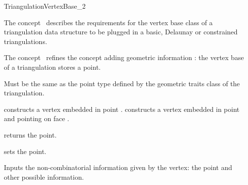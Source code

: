 

\begin{ccRefConcept}{TriangulationVertexBase_2}


\ccDefinition
  
The concept \ccRefName\ describes the requirements for the
vertex base class of a triangulation data structure
to be plugged in a basic, Delaunay or constrained
triangulations.

The concept \ccRefName\ refines the concept
adding geometric information :
the vertex base of a triangulation stores a point.


\ccTypes
{}
{Must be the same as the point type 
defined by the geometric traits class of the triangulation.} 

\ccCreation
{}  %


{constructs a vertex embedded in point .}
{constructs a vertex embedded in point  and pointing on face .}

\ccAccessFunctions
{}
{returns  the point.}

{sets the point.}


{Inputs the non-combinatorial information given by the vertex: 
the point and other possible information.}


\end{ccRefConcept}

